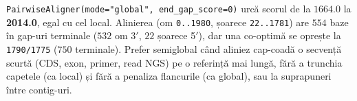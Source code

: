 \documentclass[10pt,a4paper]{article}
\newcommand{\taskheading}[1]{\vspace{4pt}{\normalsize\bfseries #1}\par\vspace{1pt}}
\begin{document}
\taskheading{Bonus — Aliniere semiglobală (+1p)}
\texttt{PairwiseAligner(mode="global", end\_gap\_score=0)} urcă scorul de la $1664.0$ la \textbf{2014.0}, egal cu cel local. Alinierea (om \texttt{0..1980}, șoarece \texttt{22..1781}) are $554$ baze în gap-uri terminale ($532$ om 3$'$, $22$ șoarece 5$'$), dar una co-optimă se oprește la \texttt{1790/1775} ($750$ terminale). Prefer semiglobal când aliniez cap-coadă o secvență scurtă (CDS, exon, primer, read NGS) pe o referință mai lungă, fără a trunchia capetele (ca local) și fără a penaliza flancurile (ca global), sau la suprapuneri între contig-uri.
\end{document}
